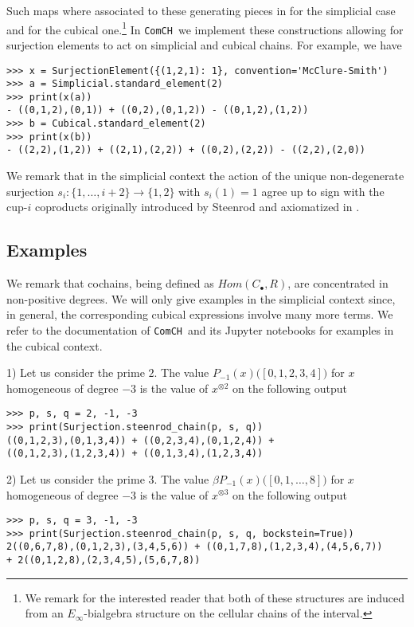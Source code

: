 \documentclass{amsart}
\newcommand{\comch}{\texttt{ComCH}}
\begin{document}
Such maps where associated to these generating pieces in \cite{medina2020prop1} for the simplicial case and \cite{medina2020chain} for the cubical one.\footnote{We remark for the interested reader that both of these structures are induced from an $E_\infty$-bialgebra structure on the cellular chains of the interval.} In \comch\, we implement these constructions allowing for surjection elements to act on simplicial and cubical chains. For example, we have
\begin{Verbatim}[frame=single, samepage=true]
>>> x = SurjectionElement({(1,2,1): 1}, convention='McClure-Smith')
>>> a = Simplicial.standard_element(2)
>>> print(x(a))
- ((0,1,2),(0,1)) + ((0,2),(0,1,2)) - ((0,1,2),(1,2))
>>> b = Cubical.standard_element(2)
>>> print(x(b))
- ((2,2),(1,2)) + ((2,1),(2,2)) + ((0,2),(2,2)) - ((2,2),(2,0))
\end{Verbatim}
We remark that in the simplicial context the action of the unique non-degenerate surjection $s_i \colon \{1, \dots, i+2\} \to \{1, 2\}$ with $s_i(1) = 1$ agree up to sign with the cup-$i$ coproducts originally introduced by Steenrod \cite{Steenrod47} and axiomatized in \cite{medina2018axiomatic}.

\subsection{Examples}

We remark that cochains, being defined as $Hom(C_\bullet, R)$, are concentrated in non-positive degrees. We will only give examples in the simplicial context since, in general, the corresponding cubical expressions involve many more terms. We refer to the documentation of \comch\, and its Jupyter notebooks for examples in the cubical context.

1) Let us consider the prime $2$. The value $P_{-1}(x)\big([0,1,2,3,4]\big)$ for $x$ homogeneous of degree $-3$ is the value of $x^{\otimes 2}$ on the following output
\begin{Verbatim}[frame=single, samepage=true]
>>> p, s, q = 2, -1, -3
>>> print(Surjection.steenrod_chain(p, s, q))
((0,1,2,3),(0,1,3,4)) + ((0,2,3,4),(0,1,2,4)) +
((0,1,2,3),(1,2,3,4)) + ((0,1,3,4),(1,2,3,4))
\end{Verbatim}

2) Let us consider the prime $3$. The value $\beta P_{-1}(x)\big([0,1,\dots,8]\big)$ for $x$ homogeneous of degree $-3$ is the value of $x^{\otimes 3}$ on the following output
\begin{Verbatim}[frame=single, samepage=true]
>>> p, s, q = 3, -1, -3
>>> print(Surjection.steenrod_chain(p, s, q, bockstein=True))
2((0,6,7,8),(0,1,2,3),(3,4,5,6)) + ((0,1,7,8),(1,2,3,4),(4,5,6,7))
+ 2((0,1,2,8),(2,3,4,5),(5,6,7,8))
\end{Verbatim}
\end{document}
